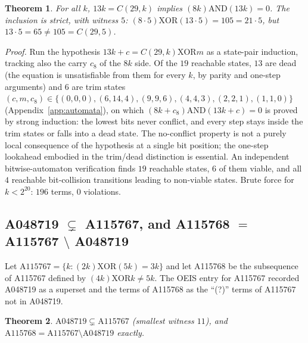\documentclass[11pt]{article}
\newtheorem{theorem}{Theorem}[section]
\newcommand{\clmul}{C} %
\begin{document}
\begin{theorem}
For all $k$, $13k = \clmul(29,k)$ implies
$(8k) \mathbin{\mathrm{AND}} (13k) = 0$. The inclusion is strict, with
witness $5$: $(8 \cdot 5) \mathbin{\mathrm{XOR}} (13 \cdot 5) = 105 =
21 \cdot 5$, but $13 \cdot 5 = 65 \ne 105 = \clmul(29,5)$.
\end{theorem}

\emph{Proof.} Run the hypothesis $13k + c = C(29,k) \mathbin{\mathrm{XOR}} m$ as a state-pair induction, tracking also the carry $c_8$ of the $8k$ side. Of the $19$ reachable states, $13$ are dead (the equation is unsatisfiable from them for every $k$, by parity and one-step arguments) and $6$ are trim states $(c, m, c_8) \in \{(0,0,0), (6,14,4), (9,9,6), (4,4,3), (2,2,1), (1,1,0)\}$ (Appendix~\ref{app:automata}), on which $(8k + c_8) \mathbin{\mathrm{AND}} (13k + c) = 0$ is proved by strong induction: the lowest bits never conflict, and every step stays inside the trim states or falls into a dead state.
The no-conflict property is not a purely local consequence of the
hypothesis at a single bit position; the one-step lookahead embodied
in the trim/dead distinction is essential. An independent
bitwise-automaton verification finds $19$ reachable states, $6$ of
them viable, and all $4$ reachable bit-collision transitions leading
to non-viable states. Brute force for $k < 2^{20}$: $196$ terms, $0$
violations.

\subsection{A048719 $\subsetneq$ A115767, and
A115768 $=$ A115767 $\setminus$ A048719}
\label{sec:a048719}
Let $\mathrm{A115767} = \{k : (2k) \mathbin{\mathrm{XOR}} (5k) = 3k\}$
and let A115768 be the subsequence of A115767 defined by
$(4k) \mathbin{\mathrm{XOR}} k \ne 5k$. The OEIS entry for A115767
recorded A048719 as a superset and the terms of A115768 as the ``(?)''
terms of A115767 not in A048719.

\begin{theorem}
$\mathrm{A048719} \subsetneq \mathrm{A115767}$ (smallest witness $11$),
and $\mathrm{A115768} = \mathrm{A115767} \setminus \mathrm{A048719}$
exactly.
\end{theorem}
\end{document}
